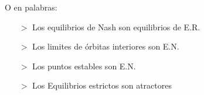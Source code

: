 \documentclass[%
 reprint,
 amsmath,amssymb,
 aps,
]{revtex4-1}
\begin{document}
O en palabras:

\begin{itemize}
  \item[$>$] Los equilibrios de Nash son equilibrios de E.R.
  \item[$>$] Los limites de órbitas interiores son E.N.
  \item[$>$] Los puntos estables son E.N.
  \item[$>$] Los Equilibrios estrictos son atractores
\end{itemize}
\end{document}
